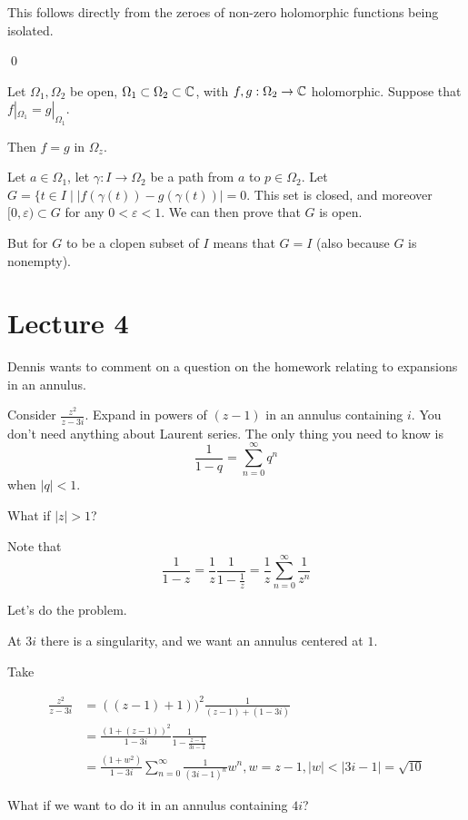 \documentclass[x11names,reqno,14pt]{extarticle}
\newcommand{\oo}{{\infty}}
\begin{document}
This follows directly from the zeroes of non-zero holomorphic functions being isolated. 

\qed

\rem 

Let $\Omega_1, \Omega_2$ be open, $\Omega_1\subset\Omega_2\subset\mathbb{C}$, with $f, g:\Omega_2\to\mathbb{C}$ holomorphic. Suppose that $f|_{\Omega_1} = g|_{\Omega_1}$. 

Then $f = g$ in $\Omega_z$. 

\proof

Let $a \in \Omega_1$, let $\gamma:I\to\Omega_2$ be a path from $a$ to $p \in \Omega_2$. Let $G = \{t \in I \mid |f(\gamma(t)) - g(\gamma(t))| = 0$. This set is closed, and moreover $[0, \varepsilon) \subset G$ for any $0<\varepsilon<1$. We can then prove that $G$ is open. 

But for $G$ to be a clopen subset of $I$ means that $G = I$ (also because $G$ is nonempty). 

\section*{Lecture 4}

\rem

Dennis wants to comment on a question on the homework relating to expansions in an annulus. 

Consider $\frac{z^2}{z - 3i}$. Expand in powers of $(z - 1)$ in an annulus containing $i$. You don't need anything about Laurent series. The only thing you need to know is 
\[
\frac{1}{1 - q} = \sum_{n=0}^\oo q^n
\]
when $|q| < 1$. 

What if $|z| > 1$?

Note that 
\[
\frac{1}{1 - z} = \frac{1}{z}\frac{1}{1 - \frac{1}{z}} = \frac{1}{z}\sum_{n=0}^\oo\frac{1}{z^n}
\]

Let's do the problem. 

At $3i$ there is a singularity, and we want an annulus centered at $1$. 

Take 

\begin{align*}
\frac{z^2}{z - 3i} & = ((z - 1) + 1))^2\frac{1}{(z - 1) + (1 - 3i)} \\
						  & = \frac{(1 + (z - 1))^2}{1 - 3i}\frac{1}{1 - \frac{z - 1}{3i - 1}} \\
						  & = \frac{(1 + w^2)}{1 - 3i}\sum_{n=0}^\oo\frac{1}{(3i - 1)^n}w^n, w = z - 1, |w| < |3i - 1| = \sqrt{10}
\end{align*}

What if we want to do it in an annulus containing $4i$? 
\end{document}
